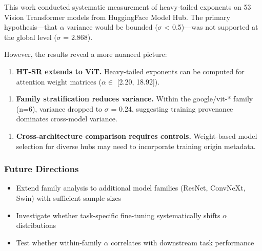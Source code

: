 
This work conducted systematic measurement of heavy-tailed exponents on 53 Vision Transformer models from HuggingFace Model Hub. The primary hypothesis---that $\alpha$ variance would be bounded ($\sigma$ < 0.5)---was not supported at the global level ($\sigma$ = 2.868).

However, the results reveal a more nuanced picture:

\begin{enumerate}
\item \textbf{HT-SR extends to ViT.} Heavy-tailed exponents can be computed for attention weight matrices ($\alpha \in$ [2.20, 18.92]).
\end{enumerate}

\begin{enumerate}
\item \textbf{Family stratification reduces variance.} Within the google/vit-* family (n=6), variance dropped to $\sigma$ = 0.24, suggesting training provenance dominates cross-model variance.
\end{enumerate}

\begin{enumerate}
\item \textbf{Cross-architecture comparison requires controls.} Weight-based model selection for diverse hubs may need to incorporate training origin metadata.
\end{enumerate}

\subsubsection{Future Directions}

\begin{itemize}
\item Extend family analysis to additional model families (ResNet, ConvNeXt, Swin) with sufficient sample sizes
\item Investigate whether task-specific fine-tuning systematically shifts $\alpha$ distributions
\item Test whether within-family $\alpha$ correlates with downstream task performance
\end{itemize}

